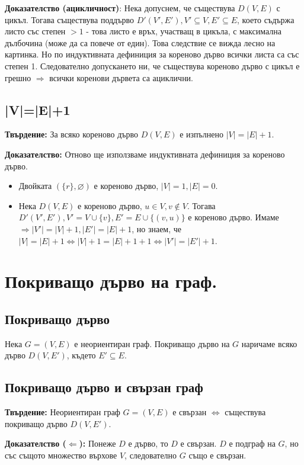 \documentclass[fleqn,12pt]{article}
\begin{document}
\textbf{Доказателство (ацикличност)}: Нека допуснем, че съществува $D(V,E)$ с цикъл. Тогава съществува поддърво $D'(V', E'), V' \subseteq V, E' \subseteq E$, 
което съдържа листо със степен $>1$ - това листо е връх, участващ в цикъла, с максимална дълбочина (може да са повече от един). Това следствие се вижда лесно на картинка. 
Но по индуктивната дефиниция за кореново дърво всички листа са със степен 1. Следователно допускането ни, че съществува кореново дърво с цикъл е грешно $\Rightarrow$ всички коренови дървета
са ациклични.
\vspace{10mm}

\subsection{|V|=|E|+1}
\textbf{Твърдение:} За всяко кореново дърво $D(V,E)$ е изпълнено $|V| = |E| + 1$.

\textbf{Доказателство:} Отново ще използваме индуктивната дефиниция за кореново дърво.
\begin{itemize}
	\item Двойката $(\{r\}, \varnothing)$ е кореново дърво, $|V| = 1, |E| = 0$.
	\item Нека $D(V,E)$ е кореново дърво, $u \in V, v \notin V$. Тогава $D'(V', E'), V' = V \cup \{v\}, E' = E \cup \{ (v, u)\}$ е кореново дърво.
	Имаме $\Rightarrow |V'| = |V| + 1, |E'| = |E| + 1$, но знаем, че $|V| = |E| + 1 \Leftrightarrow |V| + 1 = |E| + 1 + 1 \Leftrightarrow |V'| = |E'| + 1$.
\end{itemize}

\section{Покриващо дърво на граф.}
\subsection{Покриващо дърво}
Нека $G = (V, E)$ е неориентиран граф. Покриващо дърво на $G$ наричаме всяко дърво $D(V, E')$, където $E' \subseteq E$.

\subsection{Покриващо дърво и свързан граф} 

\textbf{Твърдение:} Неориентиран граф $G = (V, E)$ е свързан $\Leftrightarrow$ съществува покриващо дърво $D(V, E')$.

\textbf{Доказателство ($\Leftarrow$):} Понеже $D$ е дърво, то $D$ е свързан. $D$ е подграф на $G$, но със същото множество върхове $V$, следователно $G$ също е свързан.
\end{document}
